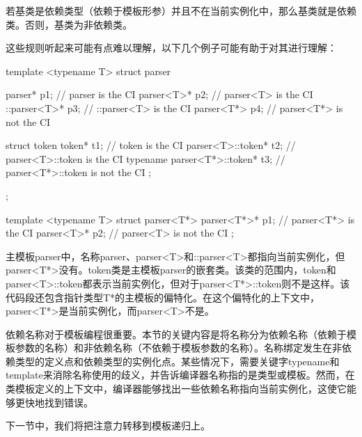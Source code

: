 \begin{note}
若基类是依赖类型（依赖于模板形参）并且不在当前实例化中，那么基类就是依赖类。否则，基类为非依赖类。
\end{note}

这些规则听起来可能有点难以理解，以下几个例子可能有助于对其进行理解：

\begin{cpp}
template <typename T>
struct parser
{
	parser* p1; // parser is the CI
	parser<T>* p2; // parser<T> is the CI
	::parser<T>* p3; // ::parser<T> is the CI
	parser<T*> p4; // parser<T*> is not the CI

	struct token
	{
		token* t1; // token is the CI
		parser<T>::token* t2; // parser<T>::token is the CI
		typename parser<T*>::token* t3;
		// parser<T*>::token is not the CI
	};
};

template <typename T>
struct parser<T*>
{
	parser<T*>* p1; // parser<T*> is the CI
	parser<T>* p2; // parser<T> is not the CI
};
\end{cpp}

主模板parser中，名称parser、parser<T>和::parser<T>都指向当前实例化，但parser<T*>没有。token类是主模板parser的嵌套类。该类的范围内，token和parser<T>::token都表示当前实例化，但对于parser<T*>::token则不是这样。该代码段还包含指针类型T*的主模板的偏特化。在这个偏特化的上下文中，parser<T*>是当前实例化，而parser<T>不是。

依赖名称对于模板编程很重要。本节的关键内容是将名称分为依赖名称（依赖于模板参数的名称）和非依赖名称（不依赖于模板参数的名称）。名称绑定发生在非依赖类型的定义点和依赖类型的实例化点。某些情况下，需要关键字typename和template来消除名称使用的歧义，并告诉编译器名称指的是类型或模板。然而，在类模板定义的上下文中，编译器能够找出一些依赖名称指向当前实例化，这使它能够更快地找到错误。

下一节中，我们将把注意力转移到模板递归上。























